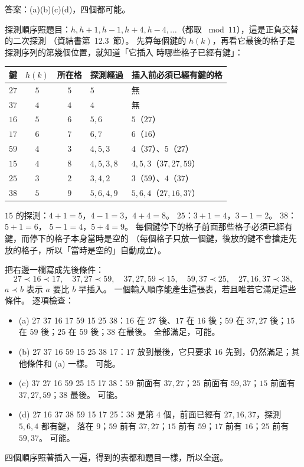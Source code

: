 \begin{pastsoln}
答案：(a)(b)(c)(d)，四個都可能。

探測順序照題目：$h, h + 1, h - 1, h + 4, h - 4, \ldots$（都取 $\bmod 11$），這是正負交替的二次探測
（資結書第~12.3~節）。 先算每個鍵的 $h(k)$，再看它最後的格子是探測序列的第幾個位置，就知道「它插入
時哪些格子已經有鍵」：
\begin{center}
\small
\begin{tabular}{cccll}
\toprule
鍵 & $h(k)$ & 所在格 & 探測經過 & 插入前必須已經有鍵的格 \\
\midrule
$27$ & $5$ & $5$ & $5$ & 無 \\
$37$ & $4$ & $4$ & $4$ & 無 \\
$16$ & $5$ & $6$ & $5, 6$ & $5$（$27$） \\
$17$ & $6$ & $7$ & $6, 7$ & $6$（$16$） \\
$59$ & $4$ & $3$ & $4, 5, 3$ & $4$（$37$）、$5$（$27$） \\
$15$ & $4$ & $8$ & $4, 5, 3, 8$ & $4, 5, 3$（$37, 27, 59$） \\
$25$ & $3$ & $2$ & $3, 4, 2$ & $3$（$59$）、$4$（$37$） \\
$38$ & $5$ & $9$ & $5, 6, 4, 9$ & $5, 6, 4$（$27, 16, 37$） \\
\bottomrule
\end{tabular}
\end{center}
$15$ 的探測：$4 + 1 = 5$，$4 - 1 = 3$，$4 + 4 = 8$。 $25$：$3 + 1 = 4$，$3 - 1 = 2$。 $38$：$5 + 1 = 6$，
$5 - 1 = 4$，$5 + 4 = 9$。 每個鍵停下的格子前面那些格子必須已經有鍵，而停下的格子本身當時是空的
（每個格子只放一個鍵，後放的鍵不會搶走先放的格子，所以「當時是空的」自動成立）。

把右邊一欄寫成先後條件：
\[
27 \prec 16 \prec 17,\quad 37, 27 \prec 59,\quad 37, 27, 59 \prec 15,\quad 59, 37 \prec 25,\quad
27, 16, 37 \prec 38,
\]
$a \prec b$ 表示 $a$ 要比 $b$ 早插入。 一個輸入順序能產生這張表，若且唯若它滿足這些條件。 逐項檢查：
\begin{itemize}
\item (a) 27 37 16 17 59 15 25 38：$16$ 在 $27$ 後、$17$ 在 $16$ 後；$59$ 在 $37, 27$ 後；$15$ 在
$59$ 後；$25$ 在 $59$ 後；$38$ 在最後。 全部滿足，可能。
\item (b) 27 37 16 59 15 25 38 17：$17$ 放到最後，它只要求 $16$ 先到，仍然滿足；其他條件和 (a) 一樣。
可能。
\item (c) 37 27 16 59 25 15 17 38：$59$ 前面有 $37, 27$；$25$ 前面有 $59, 37$；$15$ 前面有 $37, 27,
59$；$38$ 最後。 可能。
\item (d) 27 16 37 38 59 15 17 25：$38$ 是第 $4$ 個，前面已經有 $27, 16, 37$，探測 $5, 6, 4$ 都有鍵，
落在 $9$；$59$ 前有 $37, 27$；$15$ 前有 $59$；$17$ 前有 $16$；$25$ 前有 $59, 37$。 可能。
\end{itemize}
四個順序照著插入一遍，得到的表都和題目一樣，所以全選。
\end{pastsoln}
